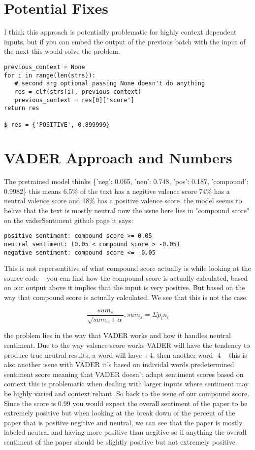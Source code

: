 \documentclass[12pt]{article}
\begin{document}
\section{Potential Fixes}
I think this approach is potentially problematic for highly context dependent inputs, but if you can embed the output of the previous batch with the input of the next this would solve the problem.
\begin{verbatim}
previous_context = None
for i in range(len(strs)):
   # second arg optional passing None doesn't do anything
   res = clf(strs[i], previous_context) 
   previous_context = res[0]['score']
return res

$ res = {'POSITIVE', 0.899999}
\end{verbatim}

\newpage
\section{VADER Approach and Numbers}
The pretrained model thinks \{'neg': 0.065, 'neu': 0.748, 'pos': 0.187, 'compound': 0.9982\}
this means 6.5\% of the text has a negitive valence
score 74\% has a neutral valence score and 18\% has a positive
valence score.
the model seems to belive that the text is mostly neutral
now the issue here lies in "compound score"
on the vaderSentiment github page it says:
\begin{verbatim}
positive sentiment: compound score >= 0.05
neutral sentiment: (0.05 < compound score > -0.05) 
negative sentiment: compound score <= -0.05
\end{verbatim}
This is not repersentitive of what compound score actually is while looking
at the source code ~\cite{vadercode}
you can find how the compound score is actually calculated, based on our
output above it implies that the input is very positive. But based on 
the way that compound score is actually calculated. We see that this is
not the case.

$$
\frac{sum_s}{\sqrt{sum_s+\alpha}}, sum_s = \Sigma{}p_i n_i
$$

the problem lies in the way that VADER works and how it handles neutral
sentiment. Due to the way valence score works VADER will have the tendency
to produce true neutral results, a word will have +4, then another word -4 ~\cite{vadercode}
this is also another issue with VADER it's based on individal words predetermined
sentiment score meaning that VADER doesn't adapt sentiment scores based on context
this is problematic when dealing with larger inputs where sentiment may be highly varied
and context reliant. So back to the issue of our compound score.
Since the score is 0.99 you would expect the overall sentiment of the paper to be
extremely positive but when looking at the break down of the percent of the paper
that is positive negitive and neutral, we can see that the paper is mostly
labeled neutral and having more positive than negitive so if anything the overall
sentiment of the paper should be slightly positive but not extremely positive.
\end{document}
